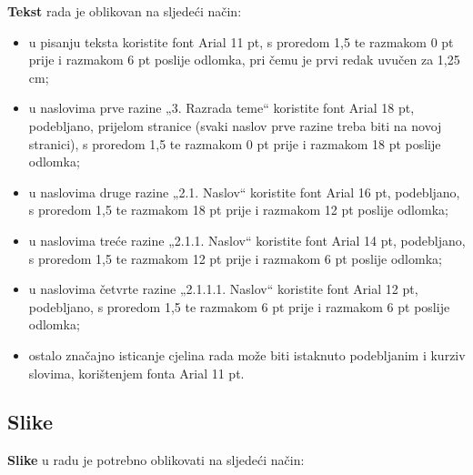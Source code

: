 \documentclass[]{foi}
\begin{document}
\textbf{Tekst} rada je oblikovan na sljedeći način:
\begin{itemize}
    \item u pisanju teksta koristite font Arial 11 pt, s proredom 1,5 te razmakom 0 pt prije i razmakom 6 pt poslije odlomka, pri čemu je prvi redak uvučen za 1,25 cm;

    \item u naslovima prve razine „3. Razrada teme“ koristite font Arial 18 pt, podebljano, prijelom stranice (svaki naslov prve razine treba biti na novoj stranici), s proredom 1,5 te razmakom 0 pt prije i razmakom 18 pt poslije odlomka;

    \item u naslovima druge razine „2.1. Naslov“ koristite font Arial 16 pt, podebljano, s proredom 1,5 te razmakom 18 pt prije i razmakom 12 pt poslije odlomka;

    \item u naslovima treće razine „2.1.1. Naslov“ koristite font Arial 14 pt, podebljano, s proredom 1,5 te razmakom 12 pt prije i razmakom 6 pt poslije odlomka;

    \item u naslovima četvrte razine „2.1.1.1. Naslov“ koristite font Arial 12 pt, podebljano, s proredom 1,5 te razmakom 6 pt prije i razmakom 6 pt poslije odlomka;

    \item ostalo značajno isticanje cjelina rada može biti istaknuto podebljanim i kurziv slovima, korištenjem fonta Arial 11 pt.
\end{itemize}

\subsection{Slike}

\textbf{Slike} u radu je potrebno oblikovati na sljedeći način:
\end{document}
